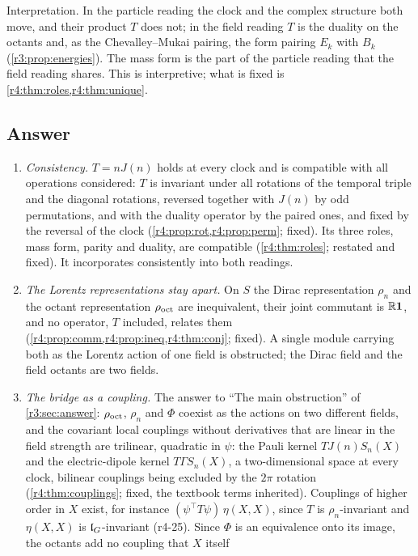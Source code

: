 Interpretation. In the particle reading the clock and the complex structure both move, and their product $T$ does not; in the field reading $T$ is
the duality on the octants and, as the Chevalley--Mukai pairing, the form pairing $E_k$ with $B_k$ (\cref{r3:prop:energies}). The mass form is the part of
the particle reading that the field reading shares. This is interpretive; what is fixed is \cref{r4:thm:roles,r4:thm:unique}.

\subsection{Answer}
\label{r4:sec:answer}

\begin{enumerate}[label=(\arabic*),leftmargin=2.2em]
\item \emph{Consistency.} $T=nJ(n)$ holds at every clock and is compatible with all operations considered: $T$ is invariant under all rotations of the
temporal triple and the diagonal rotations, reversed together with $J(n)$ by odd permutations, and with the duality operator by the paired ones,
and fixed by the
reversal of the clock (\cref{r4:prop:rot,r4:prop:perm}; fixed). Its three roles, mass form, parity and duality, are compatible (\cref{r4:thm:roles};
restated and fixed). It incorporates consistently into both readings.
\item \emph{The Lorentz representations stay apart.} On $S$ the Dirac representation $\rho_n$ and the octant representation $\rho_{\rm oct}$ are inequivalent,
their joint commutant is $\mathbb{R}\mathbf 1$, and no operator, $T$ included, relates them (\cref{r4:prop:comm,r4:prop:ineq,r4:thm:conj}; fixed). A single module
carrying both as the Lorentz action of one field is obstructed; the Dirac field and the field octants are two fields.
\item \emph{The bridge as a coupling.} The answer to ``The main obstruction'' of \cref{r3:sec:answer}: $\rho_{\rm oct}$, $\rho_n$ and $\Phi$ coexist as the
actions on two different fields, and the covariant local couplings without derivatives that are linear in the field strength are trilinear,
quadratic in $\psi$: the Pauli kernel $TJ(n)S_n(X)$ and the electric-dipole kernel $T\Gamma S_n(X)$, a two-dimensional space at every clock,
bilinear couplings being excluded by the $2\pi$ rotation (\cref{r4:thm:couplings}; fixed, the textbook terms inherited). Couplings of higher
order in $X$ exist, for instance $(\psi^{\!\top}T\psi)\,\eta(X,X)$, since $T$ is $\rho_n$-invariant and $\eta(X,X)$ is $\mathfrak l_G$-invariant (r4-25). Since $\Phi$ is an equivalence onto its image, the octants add no coupling that $X$ itself

\end{enumerate}
